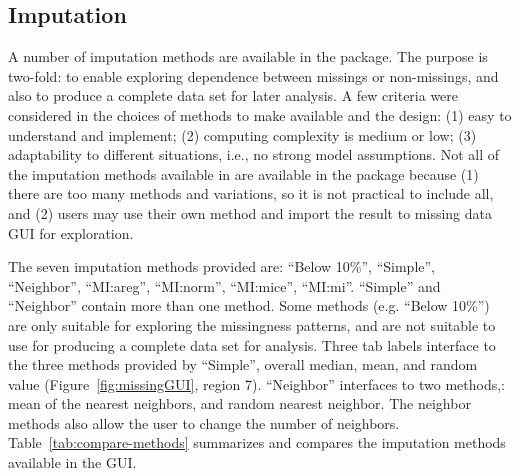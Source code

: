 \documentclass[article]{jss}
\begin{document}
\subsection{Imputation}\label{imputation}

A number of imputation methods are available in the package. The purpose is two-fold: to enable exploring dependence between missings or non-missings, and also to produce a complete data set for later analysis. A few criteria were considered in the choices of methods to make available and the design: (1) easy to understand and implement; (2) computing complexity is medium or low; (3) adaptability to different situations, i.e., no strong model assumptions. Not all of the imputation methods available in  are available in the package because (1) there are too many methods and variations, so it is not practical to include all, and (2) users may use their own method and import the result to missing data GUI for exploration.

The seven imputation methods provided are: 
``Below 10\%'', ``Simple'', ``Neighbor'', ``MI:areg'', ``MI:norm'', ``MI:mice'', ``MI:mi''. 
``Simple'' and ``Neighbor'' contain more than one method. Some methods (e.g. ``Below 10\%'') are only suitable for exploring the missingness patterns, and are not suitable to use for producing a complete data set for analysis. Three tab labels interface to the three methods provided by ``Simple'', overall median, mean, and random value (Figure~\ref{fig:missingGUI}, region 7). ``Neighbor'' interfaces to two methods,: mean of the nearest neighbors, and random nearest neighbor. The neighbor methods also allow the user to change the number of neighbors. Table~\ref{tab:compare-methods} summarizes and compares the imputation methods available in the GUI.
\end{document}
